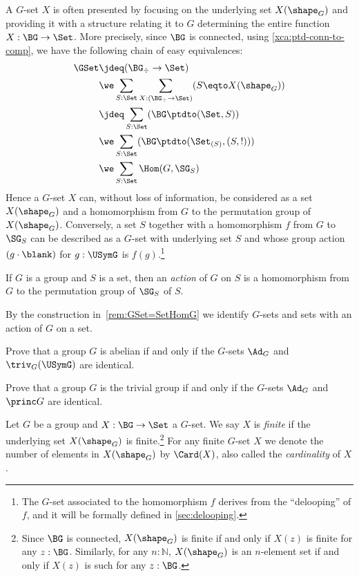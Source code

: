 \begin{remark}
  \label{rem:GSet=SetHomG}
  A $G$-set $X$ is often presented by focusing on the underlying set $X(\sh_G)$
  and providing it with a structure relating it to $G$ determining
  the entire function $X : \BG\to\Set$.
  More precisely, since $\BG$ is connected, 
  using \cref{xca:ptd-conn-to-comp},
  we have the following chain of easy equivalences:
  \begin{align*}
\GSet &\jdeq (\BG_\div\to\Set) \\
&\we \sum_{S:\Set} \sum_{X:(\BG_\div\to\Set)}(S\eqto X(\sh_G)) \\
&\jdeq \sum_{S:\Set} (\BG\ptdto(\Set,S)) \\
&\we \sum_{S:\Set} (\BG\ptdto(\Set_{(S)},(S,!))) \\
&\we \sum_{S:\Set} \Hom(G,\SG_S)
  \end{align*}
  Hence a $G$-set $X$ can, without loss of information, be considered as a set
  $X(\sh_G)$ and a homomorphism from $G$ to the permutation group of
  $X(\sh_G)$. Conversely, a set $S$ together with a homomorphism $f$ from $G$ to
  $\SG_S$ can be described as a $G$-set with underlying set $S$ and whose group
  action $(g \cdot \blank)$ for $g : \USymG$ is $f(g)$.\footnote{The $G$-set
    associated to the homomorphism $f$ derives from the ``delooping'' of $f$,
    and it will be formally defined in \ref{sec:delooping}.}
\end{remark}

\begin{definition}\label{def:Gaction}
  If $G$ is a group and $S$ is a set, then an \emph{action}
  of $G$ on $S$
  is a homomorphism from $G$ to the permutation group of $\SG_S$ of $S$.%
\end{definition}
By the construction in~\cref{rem:GSet=SetHomG} we identify $G$-sets
and sets with an action of $G$ on a set.

\begin{xca}\label{xca:Ad-triv-abelian}
  Prove that a group $G$ is abelian if and only if the $G$-sets $\Ad_G$ and
  $\triv_G(\USymG)$ are identical.
\end{xca}

\begin{xca}\label{xca:Ad-princ-trivial}
  Prove that a group $G$ is the trivial group if and only if 
  the $G$-sets $\Ad_G$ and $\princ G$ are identical.
\end{xca}

\begin{definition}\label{def:finite-G-set}
Let $G$ be a group and $X:\BG\to\Set$ a $G$-set.
We say $X$ is \emph{finite} if the underlying set $X(\sh_G)$ is finite.\footnote{Since $\BG$ is connected, $X(\sh_G)$ is finite if and only if $X(z)$ is finite for any $z:\BG$. Similarly, for any $n:\mathbb N$, $X(\sh_G)$ is an $n$-element set if and only if $X(z)$ is such for any $z:\BG$.}
For any finite $G$-set $X$ we denote the number of elements
in $X(\sh_G)$ by $\Card(X)$, also called the \emph{cardinality} of $X$.
\end{definition}

